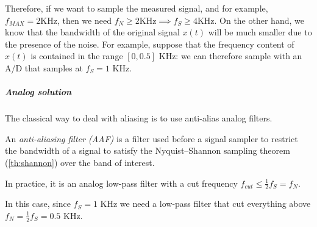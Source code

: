 \begin{appendices}
Therefore, if we want to sample the measured signal, and for example, $f_{MAX} = 2 \text{KHz}$, then we need $f_N \ge 2 \text{KHz} \implies f_S \ge 4 \text{KHz}$. On the other hand, we know that the bandwidth of the original signal $x(t)$ will be much smaller due to the presence of the noise. 
For example, suppose that the frequency content of $x(t)$ is contained in the range $[0, 0.5]$ KHz: we can therefore sample with an A/D that samples at $f_S = 1$ KHz.

\subparagraph{Analog solution} The classical way to deal with aliasing is to use anti-alias analog filters. 

\begin{recall}
    An \emph{anti-aliasing filter (AAF)} is a filter used before a signal sampler to restrict the bandwidth of a signal to satisfy the Nyquist–Shannon sampling theorem (\ref{th:shannon}) over the band of interest.
    
    In practice, it is an analog low-pass filter with a cut frequency $f_{cut} \le \frac{1}{2} f_S = f_N$. 
\end{recall}

\begin{figure}[H]
    \centering
\end{figure}

In this case, since $f_S = 1$ KHz we need a low-pass filter that cut everything above $f_N = \frac{1}{2} f_S = 0.5$ KHz.

\begin{figure}[H]
    \centering
\end{figure}
\end{appendices}
